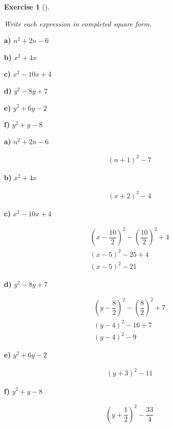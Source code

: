 \documentclass[
  letterpaper,
  DIV=11,
  numbers=noendperiod]{scrreprt}
\theoremstyle{definition}
\newtheorem{exercise}{Exercise}[chapter]
\theoremstyle{remark}
\begin{document}
\begin{exercise}[]\protect\hypertarget{exr-u6-14}{}\label{exr-u6-14}

\emph{Write each expression in completed square form.}

\textbf{a)} \(\displaystyle n^2 + 2n - 6\)

\textbf{b)} \(\displaystyle x^2 + 4x\)

\textbf{c)} \(\displaystyle x^2 - 10x + 4\)

\textbf{d)} \(\displaystyle y^2 - 8y + 7\)

\textbf{e)} \(\displaystyle y^2 + 6y - 2\)

\textbf{f)} \(\displaystyle y^2 + y - 8\)

\begin{tcolorbox}[enhanced jigsaw, opacitybacktitle=0.6, coltitle=black, arc=.35mm, colframe=quarto-callout-tip-color-frame, colback=white, bottomrule=.15mm, left=2mm, colbacktitle=quarto-callout-tip-color!10!white, titlerule=0mm, opacityback=0, title=\textcolor{quarto-callout-tip-color}{\faLightbulb}\hspace{0.5em}{🔍 View Solutions}, leftrule=.75mm, breakable, rightrule=.15mm, bottomtitle=1mm, toptitle=1mm, toprule=.15mm]

\textbf{a)} \(\displaystyle n^2 + 2n - 6\)

\begin{align*}
(n + 1)^2 - 7
\end{align*}

\textbf{b)} \(\displaystyle x^2 + 4x\)

\begin{align*}
(x + 2)^2 - 4
\end{align*}

\textbf{c)} \(\displaystyle x^2 - 10x + 4\)

\begin{align*}
\left(x - \dfrac{10}{2}\right)^2 - \left(\dfrac{10}{2}\right)^2 + 4 \\ (x - 5)^2 - 25 + 4 \\ (x - 5)^2 - 21
\end{align*}

\textbf{d)} \(\displaystyle y^2 - 8y + 7\)

\begin{align*}
\left(y - \dfrac{8}{2}\right)^2 - \left(\dfrac{8}{2}\right)^2 + 7 \\ (y - 4)^2 - 16 + 7 \\ (y - 4)^2 - 9
\end{align*}

\textbf{e)} \(\displaystyle y^2 + 6y - 2\)

\begin{align*}
(y + 3)^2 - 11
\end{align*}

\textbf{f)} \(\displaystyle y^2 + y - 8\)

\begin{align*}
(y + \dfrac{1}{2})^2 - \dfrac{33}{4}
\end{align*}

\end{tcolorbox}

\end{exercise}
\end{document}
